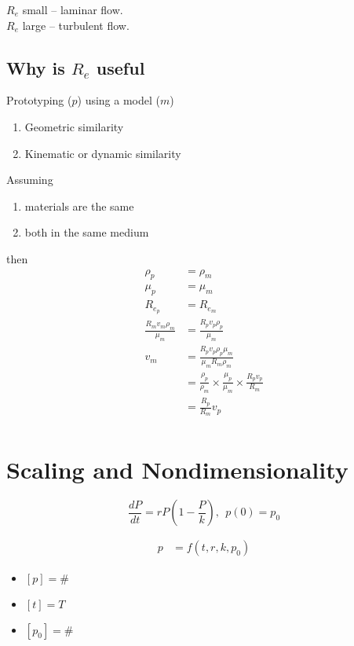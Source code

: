 \documentclass[
	date={August 28{,} 2024}
]{math486notes}
\begin{document}
$R_{e}$ small -- laminar flow.\\
$R_{e}$ large -- turbulent flow.

\section{Why is $R_{e}$ useful}\label{sec:why-is-reynolds-useful}
Prototyping ($p$) using a model ($m$)
\begin{enumerate}
	\item Geometric similarity
	\item Kinematic or dynamic similarity
\end{enumerate}

Assuming
\begin{enumerate}
	\item materials are the same
	\item both in the same medium
\end{enumerate}
then
\begin{equation*}
\begin{aligned}
	\rho_{p} &= \rho_{m}\\
	\mu_{p} &= \mu_{m}\\
	R_{e_{p}} &= R_{e_{m}}\\
	\frac{R_{m}v_{m}\rho_{m}}{\mu_{m}} &= \frac{R_{p}v_{p}\rho_{p}}{\mu_{m}}\\
	v_{m} &= \frac{R_{p}v_{p}\rho_{p}\mu_{m}}{\mu_{m}R_{m}\rho_{m}}\\
		  &= \frac{\rho_{p}}{\rho_{m}}\times\frac{\mu_{p}}{\mu_{m}}\times\frac{R_{p}v_{p}}{R_{m}}\\
		  &= \frac{R_{p}}{R_{m}}v_{p}\\
\end{aligned}
\end{equation*}

\setcounter{chapter}{1}
\chapter{Scaling and Nondimensionality}\label{ch:scaling-and-nondimensionality}

\[ \frac{dP}{dt} = rP\left( 1 - \frac{P}{k} \right), \ \ p(0)=p_{0} \]

\begin{equation*}
\begin{aligned}
	p &= f(t, r, k, p_{0})
\end{aligned}
\end{equation*}

\begin{itemize}
	\item $[p] = \#$
	\item $[t] = T$
	\item $[p_{0}] = \#$
\end{itemize}
\end{document}
